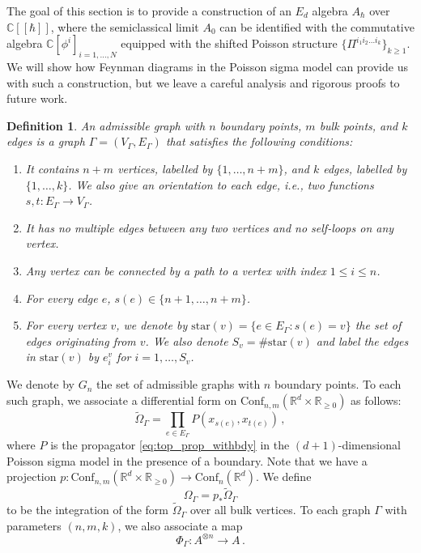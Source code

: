\documentclass[11pt]{article}
\newcommand{\C}{\mathbb{C}}
\newcommand{\R}{\mathbb{R}}
\numberwithin{equation}{section}
\newtheorem{definition}{Definition}[section]
\begin{document}
The goal of this section is to provide a construction of an $E_d$ algebra $A_\hbar$ over $\C[[\hbar]]$, where the semiclassical limit $A_{0}$ can be identified with the commutative algebra $\C[\phi^i]_{i =1,\dots,N}$ equipped with the shifted Poisson structure $\{\Pi^{i_1 i_2 \dots i_k}\}_{k\geq 1}$. We will show how Feynman diagrams in the Poisson sigma model can provide us with such a construction, but we leave a careful analysis and rigorous proofs to future work.

\begin{definition}
	An admissible graph with $n$ boundary points, $m$ bulk points, and $k$ edges is a graph $\Gamma = (V_{\Gamma},E_{\Gamma})$ that satisfies the following conditions:
	\begin{enumerate}
	\item It contains $n+m$ vertices, labelled by $\{1,\dots,n+m\}$, and $k$ edges, labelled by $\{1,\dots,k\}$. We also give an orientation to each edge, i.e., two functions $s,t: E_\Gamma \to V_{\Gamma}$.
	\item It has no multiple edges between any two vertices and no self-loops on any vertex. 
	\item Any vertex can be connected by a path to a vertex with index $1\leq i \leq n$.
	\item For every edge $e$, $s(e) \in \{n+1,\dots,n+m\}$. 
	\item For every vertex $v$, we denote by $\mathrm{star}(v) = \{e \in E_{\Gamma} : s(e) = v\}$ the set of edges originating from $v$. We also denote $S_v = \#\mathrm{star}(v)$ and label the edges in $\mathrm{star}(v)$ by $e^{v}_{i}$ for $i=1,\dots,S_v$. 
	\end{enumerate}
\end{definition}
We denote by $G_n$ the set of admissible graphs with $n$ boundary points. To each such graph, we associate a differential form on $\mathrm{Conf}_{n,m}(\R^d\times \R_{\geq 0})$ as follows:
\begin{equation}
	\widetilde{\Omega}_{\Gamma} = \prod_{e \in E_\Gamma}P(x_{s(e)},x_{t(e)})\,,
\end{equation}
where $P$ is the propagator \eqref{eq:top_prop_withbdy} in the $(d+1)$-dimensional Poisson sigma model in the presence of a boundary. Note that we have a projection $p: \mathrm{Conf}_{n,m}(\R^d\times \R_{\geq 0}) \to \mathrm{Conf}_{n}(\R^d)$. We define
\begin{equation}
	\Omega_{\Gamma} = p_{*}\widetilde{\Omega}_{\Gamma}
\end{equation}
to be the integration of the form $\widetilde{\Omega}_{\Gamma}$ over all bulk vertices. To each graph $\Gamma$ with parameters $(n,m,k)$, we also associate a map 
\begin{equation}
	\Phi_{\Gamma}: A^{\otimes n} \to A\,.
\end{equation}
\end{document}
